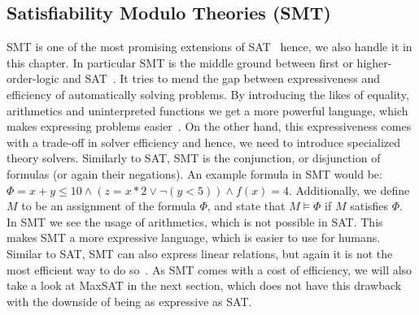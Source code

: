 \subsection{Satisfiability Modulo Theories (SMT)}
\Ac{SMT} is one of the most promising extensions of \ac{SAT}~\cite{bib:2008-marques} hence, we also handle it in this chapter. In particular \ac{SMT} is the middle ground between first or higher-order-logic and \ac{SAT}~\cite{bib:2018-clarke}. It tries to mend the gap between expressiveness and efficiency of automatically solving problems. By introducing the likes of equality, arithmetics and uninterpreted functions we get a more powerful language, which makes expressing problems easier~\cite{bib:2007-demoura}. On the other hand, this expressiveness comes with a trade-off in solver efficiency and hence, we need to introduce specialized theory solvers. Similarly to \ac{SAT}, \ac{SMT} is the conjunction, or disjunction of formulas (or again their negations). An example formula in \ac{SMT} would be: $\Phi = x + y \leq 10 \land (z = x * 2 \lor \lnot (y < 5)) \land f(x) = 4$. Additionally, we define $M$ to be an assignment of the formula $\Phi$, and state that $M \models \Phi$ if $M$ satisfies $\Phi$. In \ac{SMT} we see the usage of arithmetics, which is not possible in \ac{SAT}. This makes \ac{SMT} a more expressive language, which is easier to use for humans. Similar to \ac{SAT}, \ac{SMT} can also express linear relations, but again it is not the most efficient way to do so~\cite{bib:2008-marques}. As \ac{SMT} comes with a cost of efficiency, we will also take a look at \ac{MaxSAT} in the next section, which does not have this drawback with the downside of being as expressive as \ac{SAT}.

